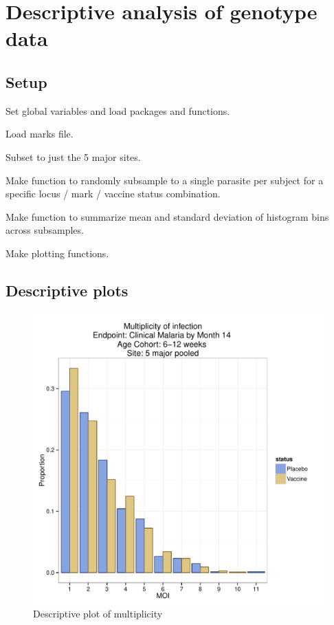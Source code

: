 \documentclass[]{article}
\author{}
\date{}
\begin{document}
\section{Descriptive analysis of genotype
data}\label{descriptive-analysis-of-genotype-data}

\subsection{Setup}\label{setup}

Set global variables and load packages and functions.

Load marks file.

Subset to just the 5 major sites.

Make function to randomly subsample to a single parasite per subject for
a specific locus / mark / vaccine status combination.

Make function to summarize mean and standard deviation of histogram bins
across subsamples.

Make plotting functions.

\subsection{Descriptive plots}\label{descriptive-plots}

\begin{figure}[htbp]
\centering
\includegraphics{figures/moi-newborn-c-1.pdf}
\caption{Descriptive plot of multiplicity}
\end{figure}
\end{document}
